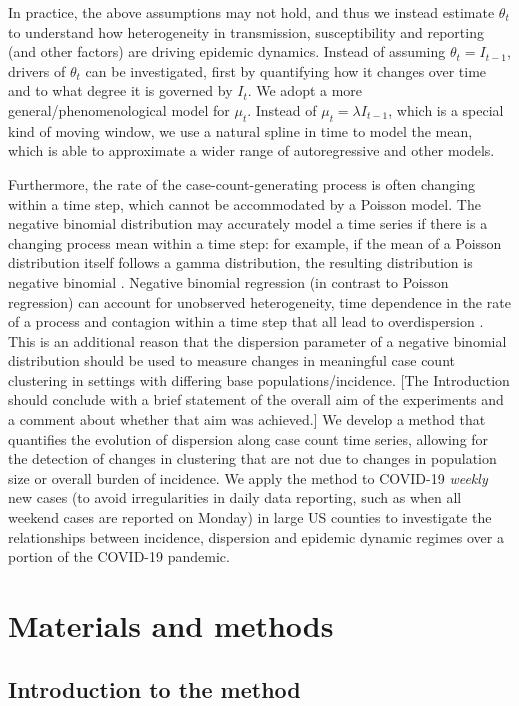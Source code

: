 \documentclass[10pt,letterpaper]{article}
\begin{document}
In practice, the above assumptions may not hold, and thus we instead estimate $\theta_t$ to understand how heterogeneity in transmission, susceptibility and reporting (and other factors) are driving epidemic dynamics. 
Instead of assuming $\theta_t = I_{t-1}$, drivers of $\theta_t$ can be investigated, first by quantifying how it changes over time and to what degree it is governed by $I_t$. 
We adopt a more general/phenomenological model for $\mu_t$. 
Instead of $\mu_t = \lambda I_{t-1}$, which is a special kind of moving window, we use a natural spline in time to model the mean, which is able to approximate a wider range of autoregressive and other models. 

Furthermore, the rate of the case-count-generating process is often changing within a time step, which cannot be accommodated by a Poisson model. 
The negative binomial distribution may accurately model a time series if there is a changing process mean within a time step: for example, if the mean of a Poisson distribution itself follows a gamma distribution, the resulting distribution is negative binomial \cite{cook_notes_nodate}. 
Negative binomial regression (in contrast to Poisson regression) can account for unobserved heterogeneity, time dependence in the rate of a process and contagion within a time step that all lead to overdispersion \cite{barron_analysis_1992}.
This is an additional reason that the dispersion parameter of a negative binomial distribution should be used to measure changes in meaningful case count clustering in settings with differing base populations/incidence. 
[The Introduction should conclude with a brief statement of the overall aim of the experiments and a comment about whether that aim was achieved.]
We develop a method that quantifies the evolution of dispersion along case count time series, allowing for the detection of changes in clustering that are not due to changes in population size or overall burden of incidence.
We apply the method to COVID-19 \emph{weekly} new cases (to avoid irregularities in daily data reporting, such as when all weekend cases are reported on Monday) in large US counties to investigate the relationships between incidence, dispersion and epidemic dynamic regimes over a portion of the COVID-19 pandemic. 

\section*{Materials and methods}
\subsection*{Introduction to the method}
\end{document}
